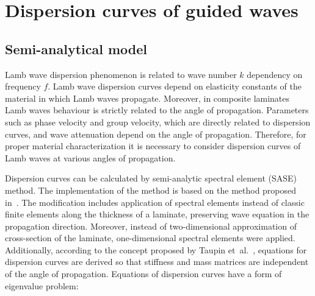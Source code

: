 \documentclass[preprint,12pt]{elsarticle}
\begin{document}
	
	\section{Dispersion curves of guided waves \label{sec:dispersion_curves}}
	\subsection{Semi-analytical model}
	Lamb wave dispersion phenomenon is related to wave number  $k$ dependency on frequency $f$. Lamb wave dispersion curves depend on elasticity constants of the material in which Lamb waves propagate. Moreover, in composite laminates Lamb waves behaviour is strictly related to the angle of propagation. Parameters such as phase velocity and group velocity, which are directly related to dispersion curves, and wave attenuation depend on the angle of propagation. Therefore, for proper material characterization it is necessary to consider dispersion curves of Lamb waves at various angles of propagation.

	Dispersion curves can be calculated by semi-analytic spectral element (SASE) method. The implementation of the method is based on the method proposed in~\cite{Bartoli2006}. The modification includes application of spectral elements instead of classic finite elements along the thickness of a laminate, preserving wave equation in the propagation direction. Moreover, instead of two-dimensional approximation of cross-section of the laminate, one-dimensional spectral elements were applied. Additionally, according to the concept proposed by Taupin et~al.~\cite{Taupin2011}, equations for dispersion curves are derived so that stiffness and mass matrices are independent of the angle of propagation. Equations of dispersion curves have a form of eigenvalue problem:
\end{document}
